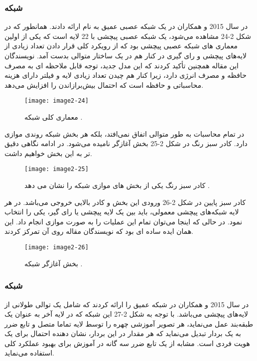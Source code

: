 \subsubsection{	شبکه }
در سال 2015  و همکاران در \cite{7298594} یک شبکه عصبی عمیق به نام  ارائه دادند. همانطور که در شکل 2-24 مشاهده می‌شود،  یک شبکه عصبی پیچشی با 22 لایه است که یکی از اولین معماری های شبکه عصبی پیچشی بود که از رویکرد کلی قرار دادن تعداد زیادی از لایه‌های پیچشی و رای گیری  در کنار هم در یک ساختار متوالی بدست آمد. نویسندگان این مقاله همچنین تأکید کردند که این مدل جدید، توجه قابل ملاحظه ای به مصرف حافظه و مصرف انرژی دارد، زیرا کنار هم چیدن تعداد زیادی لایه و فیلتر دارای هزینه محاسباتی و حافظه است که احتمال بيش‌برازاندن  را افزایش می‌دهد.
 
\begin{figure}[h]
\centering
  \texttt{[image: image2-24]}
  \caption{معماری کلی شبکه  \cite{ref1}.}
  \label{image2-24}
\end{figure}

\noindent
در  تمام محاسبات به طور متوالی اتفاق نمی‌افتد، بلکه هر بخش شبکه روندی موازی دارد. کادر سبز رنگ در شکل 2-25 بخش آغازگر نامیده می‌شود. در ادامه نگاهی دقیق تر به این بخش خواهیم داشت.
 
\begin{figure}[h]
\centering
  \texttt{[image: image2-25]}
  \caption{کادر سبز رنگ یکی از بخش های موازی شبکه را نشان می دهد \cite{ref1}.}
  \label{image2-25}
\end{figure}

\noindent
کادر سبز پایین در شکل 2-26 ورودی این بخش و کادر بالایی خروجی می‌باشد. در هر لایه شبکه‌های پیچشی معمولی، باید بین یک لایه پیچشی یا رای گیر، یکی را انتخاب نمود. در حالی که اینجا می‌توان تمام این عملیات را به صورت موازی انجام داد. این همان ایده ساده ای بود که نویسندگان مقاله روی آن تمرکز کردند.
 
\begin{figure}[h]
\centering
  \texttt{[image: image2-26]}
  \caption{بخش آغازگر شبکه  \cite{ref1}.}
  \label{image2-26}
\end{figure}

\subsubsection{	شبکه }
در سال 2015  و همکاران در \cite{parkhi2015deep} شبکه عمیق  را ارائه کردند که شامل یک توالی طولانی از لایه‌های پیچشی می‌باشد. با توجه به شکل 2-27 این شبکه که در لایه آخر به عنوان یک طبقه‌بند عمل می‌نماید، هر تصویر آموزشی چهره را توسط لایه تماما متصل و تابع ضرر  به یک بردار تبدیل می‌نماید که هر مقدار در این بردار، نشان دهنده احتمال برای یک هویت فردی است.  مشابه  از یک تابع ضرر سه گانه  در آموزش برای بهبود عملکرد کلی استفاده می‌نماید.
 
